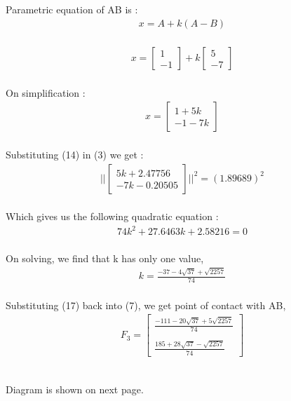 \documentclass[journal,12pt,twocolumn]{IEEEtran}
\theoremstyle{remark}
\begin{document}
\begin{flushleft}
	\bigskip

	Parametric equation of AB is : 
	\begin{align}
		x = A + k(A-B)
	\end{align}\\
	\begin{align}
		x = \begin{bmatrix}
			1\\
			-1
		\end{bmatrix}
		+ k\begin{bmatrix}
			5\\
			-7
		\end{bmatrix}
	\end{align}\\

	On simplification :
	\begin{align}
		x = \begin{bmatrix}
			1+5k\\
			-1-7k
		\end{bmatrix}
	\end{align}\\

	Substituting (14) in (3) we get :\\
	\begin{align}
		\lvert \lvert 
			\begin{bmatrix}
				5k+2.47756\\
				-7k-0.20505
			\end{bmatrix}
		\rvert \rvert ^2 = (1.89689)^2
	\end{align}\\

	Which gives us the following quadratic equation :
	\begin{align}
		74k^2 + 27.6463k + 2.58216 = 0
	\end{align}\\

	On solving, we find that k has only one value,
	\begin{align}
		k = \frac{-37-4\sqrt{37}+\sqrt{2257}}{74}
	\end{align}\\

	Substituting (17) back into (7), we get point of contact with AB,
	\begin{align}
		{F}_3 = \begin{bmatrix}
			\frac{-111-20\sqrt{37}+5\sqrt{2257}}{74}\\ \\
			\frac{185+28\sqrt{37}-\sqrt{2257}}{74}
		\end{bmatrix}
	\end{align}\\
	
	\bigskip

	Diagram is shown on next page.

\end{flushleft}
\end{document}
